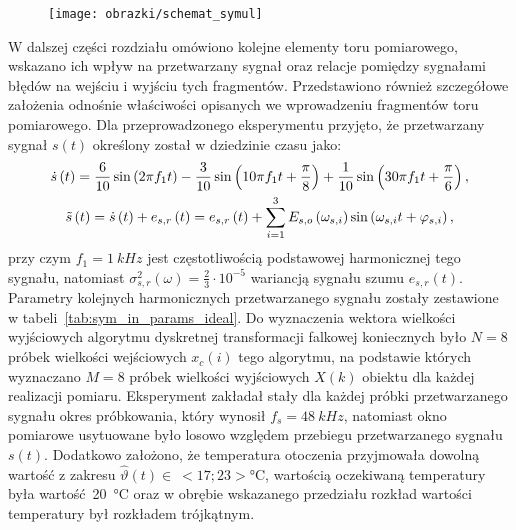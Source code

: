 \begin{figure}[htb!]
\begin{center}
\texttt{[image: obrazki/schemat\_symul]}
\end{center}
\end{figure}

W dalszej części rozdziału omówiono kolejne elementy toru pomiarowego, wskazano ich wpływ na przetwarzany sygnał oraz relacje pomiędzy sygnałami błędów na wejściu i wyjściu tych fragmentów. Przedstawiono również szczegółowe założenia odnośnie właściwości opisanych we wprowadzeniu fragmentów toru pomiarowego. Dla przeprowadzonego eksperymentu przyjęto, że przetwarzany sygnał $s(t)$ określony został w dziedzinie czasu jako:
\begin{gather}
\dot{s} \left(t\right) = \frac{6}{10} \sin \left( 2 \pi f_{1} t \right) - \frac{3}{10} \sin \left( 10 \pi f_{1} t + \frac{\pi}{8} \right) + \frac{1}{10} \sin \left( 30 \pi f_{1} t + \frac{\pi}{6} \right) \label{eq:sym_in_ideal}, \\
\tilde{s} \left(t\right) = \dot{s} \left(t\right) + e_{s,r} \left(t\right) = e_{s,r} \left(t\right) + \sum _{i=1} ^{3} E_{s,o} \left(\omega_{s,i}\right) \sin \left(\omega_{s,i} t + \varphi_{s,i}\right) \label{eq:sym_in_real},
\end{gather}
przy czym $f_{1} = \qty{1}{kHz}$ jest częstotliwością podstawowej harmonicznej tego sygnału, natomiast $\sigma_{s,r}^{2}(\omega) = \frac{2}{3} \cdot 10^{-5}$ wariancją sygnału szumu $e_{s,r}(t)$. Parametry kolejnych harmonicznych przetwarzanego sygnału zostały zestawione w tabeli~\ref{tab:sym_in_params_ideal}. Do wyznaczenia wektora wielkości wyjściowych algorytmu dyskretnej transformacji falkowej koniecznych było $N = 8$ próbek wielkości wejściowych $x_{c}(i)$ tego algorytmu, na podstawie których wyznaczano $M = 8$ próbek wielkości wyjściowych $X(k)$ obiektu dla każdej realizacji pomiaru. Eksperyment zakładał stały dla każdej próbki przetwarzanego sygnału okres próbkowania, który wynosił $f_{s} = \qty{48}{kHz}$, natomiast okno pomiarowe usytuowane było losowo względem przebiegu przetwarzanego sygnału $s(t)$. Dodatkowo założono, że temperatura otoczenia przyjmowała dowolną wartość z zakresu $\hat{\vartheta}(t)\in~<17;23>\unit{\degreeCelsius}$, wartością oczekiwaną temperatury była wartość~\qty{20}{\degreeCelsius} oraz w obrębie wskazanego przedziału rozkład wartości temperatury był rozkładem trójkątnym.

